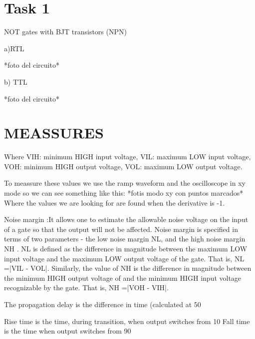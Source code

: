 \documentclass[a4paper,12pt]{article}
\begin{document}
\section*{Task 1}
NOT gates with BJT transistors (NPN)

a)RTL

*foto del circuito*

b) TTL

*foto del circuito*

\section*{MEASSURES}

Where VIH: minimum HIGH input voltage, VIL: maximum LOW input voltage, VOH: minimum HIGH output voltage, VOL: maximum LOW output voltage.

To meassure these values we use the ramp waveform and the oscilloscope in xy mode so we can see something like this:
*fotis modo xy con puntos marcados*
Where the values we are looking for are found when the derivative is -1.

Noise margin :It allows one to estimate the allowable noise voltage on the input of a gate so that the output will not be affected. Noise margin is specified in terms of two parameters - the low noise margin NL, and the high noise margin NH . NL is defined as the difference in magnitude between the maximum LOW input voltage and the maximum LOW output voltage of the gate. That is, NL =|VIL - VOL|. Similarly, the value of NH is the difference in magnitude between the minimum HIGH output voltage of and the minimum HIGH input voltage recognizable by the gate. That is, NH =|VOH - VIH|. 


The propagation delay  is the difference in time (calculated at 50%

 Rise time is the time, during transition, when output switches from 10%
Fall time is the time when output switches from 90%
\end{document}
